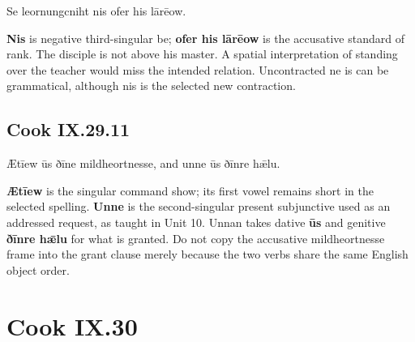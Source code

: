 \par\begin{minipage}{\linewidth}\raggedright
Se leornungcniht nis ofer his lārēow.

\textbf{Nis} is negative third-singular be; \textbf{ofer his lārēow} is the accusative standard of rank. The disciple is not above his master. A spatial interpretation of standing over the teacher would miss the intended relation. Uncontracted ne is can be grammatical, although nis is the selected new contraction.

\end{minipage}\par\addvspace{4pt}

\subsection*{Cook IX.29.11}

\par\begin{minipage}{\linewidth}\raggedright
Ætīew ūs ðīne mildheortnesse, and unne ūs ðīnre hǣlu.

\textbf{Ætīew} is the singular command show; its first vowel remains short in the selected spelling. \textbf{Unne} is the second-singular present subjunctive used as an addressed request, as taught in Unit 10. Unnan takes dative \textbf{ūs} and genitive \textbf{ðīnre hǣlu} for what is granted. Do not copy the accusative mildheortnesse frame into the grant clause merely because the two verbs share the same English object order.

\end{minipage}\par\addvspace{4pt}

\section*{Cook IX.30}

